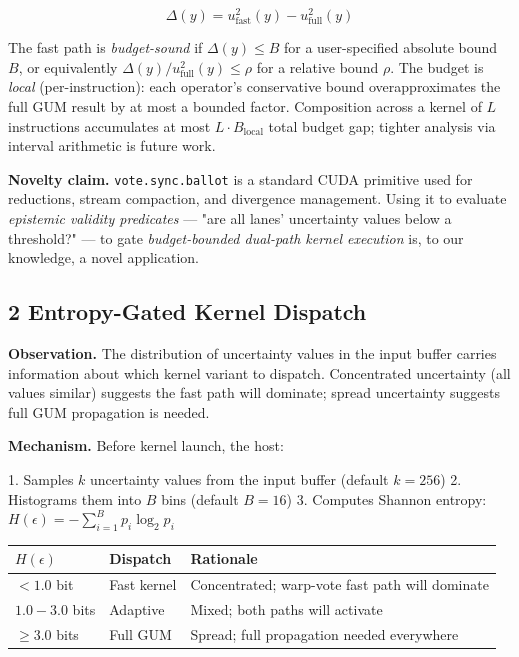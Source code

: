 \documentclass[11pt]{article}
\begin{document}
{{\[\Delta(y) = u^2_{\text{fast}}(y) - u^2_{\text{full}}(y)\]

The fast path is \emph{budget-sound} if $\Delta(y) \leq B$ for a user-specified absolute bound $B$, or equivalently $\Delta(y) / u^2_{\text{full}}(y) \leq \rho$ for a relative bound $\rho$. The budget is \emph{local} (per-instruction): each operator's conservative bound overapproximates the full GUM result by at most a bounded factor. Composition across a kernel of $L$ instructions accumulates at most $L \cdot B_{\text{local}}$ total budget gap; tighter analysis via interval arithmetic is future work.

\textbf{Novelty claim.} \texttt{vote.sync.ballot} is a standard CUDA primitive used for reductions, stream compaction, and divergence management. Using it to evaluate \emph{epistemic validity predicates} --- "are all lanes' uncertainty values below a threshold?" --- to gate \emph{budget-bounded dual-path kernel execution} is, to our knowledge, a novel application.

\subsection{2 Entropy-Gated Kernel Dispatch}

\textbf{Observation.} The distribution of uncertainty values in the input buffer carries information about which kernel variant to dispatch. Concentrated uncertainty (all values similar) suggests the fast path will dominate; spread uncertainty suggests full GUM propagation is needed.

\textbf{Mechanism.} Before kernel launch, the host:

1. Samples $k$ uncertainty values from the input buffer (default $k = 256$)
2. Histograms them into $B$ bins (default $B = 16$)
3. Computes Shannon entropy: $H(\epsilon) = -\sum_{i=1}^{B} p_i \log_2 p_i$

\begin{table}[t]\centering
\begin{tabular}{lll}
\toprule
$H(\epsilon)$ & Dispatch & Rationale \\
\midrule
$< 1.0$ bit & Fast kernel & Concentrated; warp-vote fast path will dominate \\
$1.0 - 3.0$ bits & Adaptive & Mixed; both paths will activate \\
$\geq 3.0$ bits & Full GUM & Spread; full propagation needed everywhere \\
\bottomrule
\end{tabular}
\end{table}

}}
\end{document}
